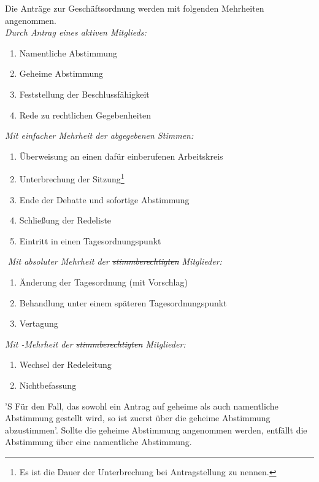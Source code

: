 \documentclass[%
	parskip=half,
]{scrartcl}
\newcounter{enumitem}
\newcommand{\edit}[1]{{\color{red} #1}}
\newcommand{\add}[1]{{\color{blue} #1}}
\newcommand{\new}[1]{{\color{orange} #1}}
\newcommand{\delete}[1]{{\color{red} \sout{#1}}}
\begin{document}
\begin{contract}
Die Anträge zur Geschäftsordnung werden mit folgenden Mehrheiten angenommen. \\
\newline
\textit{Durch Antrag eines \new{aktiven} Mitglieds:}
\begin{enumerate}[\qquad a)]
	\item Namentliche Abstimmung
	\item Geheime Abstimmung
	\item Feststellung der Beschlussfähigkeit
	\item Rede zu rechtlichen Gegebenheiten
	\setcounter{enumitem}{\value{enumi}}
\end{enumerate}
\textit{Mit einfacher Mehrheit der abgegebenen Stimmen:}
\begin{enumerate}[\qquad a)]
	\setcounter{enumi}{\value{enumitem}}
	\item Überweisung \edit{an einen dafür einberufenen Arbeitskreis}
	\item Unterbrechung der Sitzung\footnote{\add{Es ist die Dauer der Unterbrechung bei Antragstellung zu nennen.}}
	\item Ende der Debatte und sofortige Abstimmung
	\item \edit{Schließung der Redeliste}
	\item Eintritt in einen Tagesordnungspunkt
	\setcounter{enumitem}{\value{enumi}}
\end{enumerate}​
\textit{Mit absoluter Mehrheit der \delete{stimmberechtigten} Mitglieder:}
\begin{enumerate}[\qquad a)]
	\setcounter{enumi}{\value{enumitem}}
	\item Änderung der Tagesordnung (mit Vorschlag)
	\item Behandlung unter einem späteren Tagesordnungspunkt
	\item Vertagung
	\setcounter{enumitem}{\value{enumi}}
\end{enumerate}
\textit{Mit -Mehrheit der \delete{stimmberechtigten} Mitglieder:}
\begin{enumerate}[\qquad a)]
	\setcounter{enumi}{\value{enumitem}}
	\item Wechsel der \edit{Redeleitung}
	\item Nichtbefassung
\end{enumerate}

'S Für den Fall, das sowohl ein Antrag auf geheime als auch namentliche Abstimmung gestellt wird, \edit{so ist} zuerst 
über die geheime Abstimmung \edit{abzustimmen}'. Sollte die geheime Abstimmung angenommen werden, entfällt \edit{die} 
Abstimmung über eine namentliche Abstimmung.


\end{contract}
\end{document}
